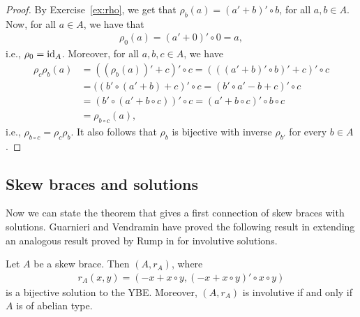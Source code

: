     \begin{proof}
    By Exercise~\ref{ex:rho}, we get that $\rho_b(a)=(a'+b)'\circ b$, for all $a,b\in A$.
    Now, for all $a\in A$, we have that 
    \begin{align*}
        \rho_0(a) = (a'+0)'\circ 0 = a,
    \end{align*}
    i.e., $\rho_0=\operatorname{id}_A$. Moreover, for all $a,b,c\in A$, we have
    \begin{align*}
        \rho_c\rho_b(a)&=((\rho_b(a))'+c)'\circ c
        = (((a'+b)'\circ b)' + c)' \circ c\\
        &= ((b'\circ (a'+b) + c)'\circ c
        = (b'\circ a' - b + c)' \circ c\\
        &= (b'\circ(a' +b\circ c))'\circ c
        = (a' +b\circ c)'\circ b \circ c\\
        &= \rho_{b\circ c}(a),
    \end{align*}
    i.e., $\rho_{b\circ c} = \rho_c\rho_b$. It also follows that $\rho_b$ is bijective with inverse $\rho_{b'}$ for every $b\in A$.
    \end{proof}

    \subsection{Skew braces and solutions}
    
    Now we can state the theorem that gives a first connection of skew braces with solutions. 
    Guarnieri and Vendramin have proved the following result in \cite{MR3647970} extending an analogous result proved by Rump in \cite{MR2278047} for involutive solutions.  

    \begin{theorem}
        Let $A$ be a skew brace. Then $(A,r_A)$, where 
        \begin{align*}
            r_A(x, y) = (-x + x\circ y, (-x + x \circ y)'\circ x\circ y)
        \end{align*}
        is a bijective solution to the YBE.
        Moreover, $(A, r_A)$ is involutive if and only if $A$ is of abelian type.
    \end{theorem}

